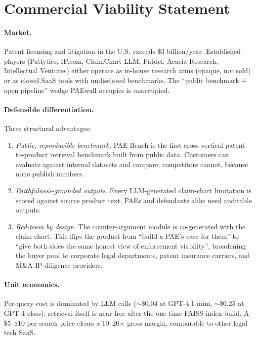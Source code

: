 \documentclass[11pt]{article}
\begin{document}
\section{Commercial Viability Statement}

\paragraph{Market.} Patent licensing and litigation in the U.S. exceeds \$3 billion/year. Established players (Patlytics, IP.com, ClaimChart LLM, Patdel, Acacia Research, Intellectual Ventures) either operate as in-house research arms (opaque, not sold) or as closed SaaS tools with undisclosed benchmarks. The ``public benchmark $+$ open pipeline'' wedge PAEwall occupies is unoccupied.

\paragraph{Defensible differentiation.} Three structural advantages:
\begin{enumerate}
    \item \emph{Public, reproducible benchmark.} PAE-Bench is the first cross-vertical patent-to-product retrieval benchmark built from public data. Customers can evaluate against internal datasets and compare; competitors cannot, because none publish numbers.
    \item \emph{Faithfulness-grounded outputs.} Every LLM-generated claim-chart limitation is scored against source product text. PAEs and defendants alike need auditable outputs.
    \item \emph{Red-team by design.} The counter-argument module is co-generated with the claim chart. This flips the product from ``build a PAE's case for them'' to ``give both sides the same honest view of enforcement viability'', broadening the buyer pool to corporate legal departments, patent insurance carriers, and M\&A IP-diligence providers.
\end{enumerate}

\paragraph{Unit economics.} Per-query cost is dominated by LLM calls ($\sim$\$0.04 at GPT-4.1-mini, $\sim$\$0.25 at GPT-4-class); retrieval itself is near-free after the one-time FAISS index build. A \$5--\$10 per-search price clears a 10--20$\times$ gross margin, comparable to other legal-tech SaaS.
\end{document}
